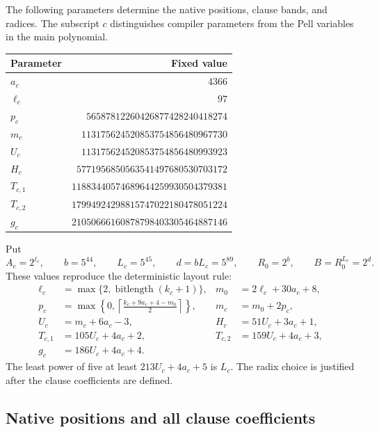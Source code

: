 The following parameters determine the native positions, clause bands,
and radices. The subscript $c$ distinguishes compiler parameters from the
Pell variables in the main polynomial.
\begin{center}
\small
\begin{tabular}{@{}lr@{}}
\toprule
Parameter & Fixed value\\
\midrule
$a_c$ & $4366$\\
$\ell_c$ & $97$\\
$p_c$ & $56587812260426877428240418274$\\
$m_c$ & $113175624520853754856480967730$\\
$U_c$ & $113175624520853754856480993923$\\
$H_c$ & $5771956850563541497680530703172$\\
$T_{c,1}$ & $11883440574689644259930504379381$\\
$T_{c,2}$ & $17994924298815747022180478051224$\\
$g_c$ & $21050666160878798403305464887146$\\
\bottomrule
\end{tabular}
\end{center}
Put
\begin{equation}\label{app:fixed-radices}
 A_c=2^{\ell_c},\qquad b=5^{44},\qquad L_c=5^{45},\qquad
 d=bL_c=5^{89},\qquad R_0=2^b,\qquad B=R_0^{L_c}=2^d.
\end{equation}
These values reproduce the deterministic layout rule:
\begin{align*}
 \ell_c&=\max\{2,\operatorname{bitlength}(k_c+1)\},&
 m_0&=2\ell_c+30a_c+8,\\
 p_c&=\max\left\{0,\left\lceil
       \frac{k_c+9a_c+4-m_0}{2}\right\rceil\right\},&
 m_c&=m_0+2p_c,\\
 U_c&=m_c+6a_c-3,&H_c&=51U_c+3a_c+1,\\
 T_{c,1}&=105U_c+4a_c+2,&T_{c,2}&=159U_c+4a_c+3,\\
 g_c&=186U_c+4a_c+4.
\end{align*}
The least power of five at least $213U_c+4a_c+5$ is $L_c$.
The radix choice is justified after the clause coefficients are defined.

\subsection{Native positions and all clause coefficients}

